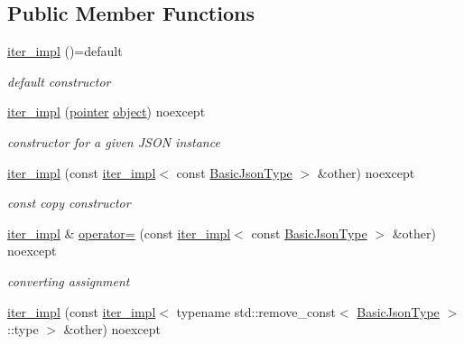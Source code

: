 \subsection*{Public Member Functions}
\begin{DoxyCompactItemize}
\item 
\hyperlink{classnlohmann_1_1detail_1_1iter__impl_a19aa457f9c4af1b7e3af59839132cc5c}{iter\+\_\+impl} ()=default
\begin{DoxyCompactList}\small\item\em default constructor \end{DoxyCompactList}\item 
\hyperlink{classnlohmann_1_1detail_1_1iter__impl_a88a00484ac201c52fc5f613d88a2918b}{iter\+\_\+impl} (\hyperlink{classnlohmann_1_1detail_1_1iter__impl_a69e52f890ce8c556fd68ce109e24b360}{pointer} \hyperlink{namespacenlohmann_1_1detail_a1ed8fc6239da25abcaf681d30ace4985aa8cfde6331bd59eb2ac96f8911c4b666}{object}) noexcept
\begin{DoxyCompactList}\small\item\em constructor for a given J\+S\+ON instance \end{DoxyCompactList}\item 
\hyperlink{classnlohmann_1_1detail_1_1iter__impl_a71f84fb6e009619f12972bcf9002b8cd}{iter\+\_\+impl} (const \hyperlink{classnlohmann_1_1detail_1_1iter__impl}{iter\+\_\+impl}$<$ const \hyperlink{classnlohmann_1_1detail_1_1iter__impl_abf18f18793f84b0222aebb5a2a87da7a}{Basic\+Json\+Type} $>$ \&other) noexcept
\begin{DoxyCompactList}\small\item\em const copy constructor \end{DoxyCompactList}\item 
\hyperlink{classnlohmann_1_1detail_1_1iter__impl}{iter\+\_\+impl} \& \hyperlink{classnlohmann_1_1detail_1_1iter__impl_a9a5cd7864a8f848ef107d3f5a330f5e7}{operator=} (const \hyperlink{classnlohmann_1_1detail_1_1iter__impl}{iter\+\_\+impl}$<$ const \hyperlink{classnlohmann_1_1detail_1_1iter__impl_abf18f18793f84b0222aebb5a2a87da7a}{Basic\+Json\+Type} $>$ \&other) noexcept
\begin{DoxyCompactList}\small\item\em converting assignment \end{DoxyCompactList}\item 
\hyperlink{classnlohmann_1_1detail_1_1iter__impl_a867f7eb55091be31b013adb3e46816d3}{iter\+\_\+impl} (const \hyperlink{classnlohmann_1_1detail_1_1iter__impl}{iter\+\_\+impl}$<$ typename std\+::remove\+\_\+const$<$ \hyperlink{classnlohmann_1_1detail_1_1iter__impl_abf18f18793f84b0222aebb5a2a87da7a}{Basic\+Json\+Type} $>$\+::type $>$ \&other) noexcept

\end{DoxyCompactItemize}
